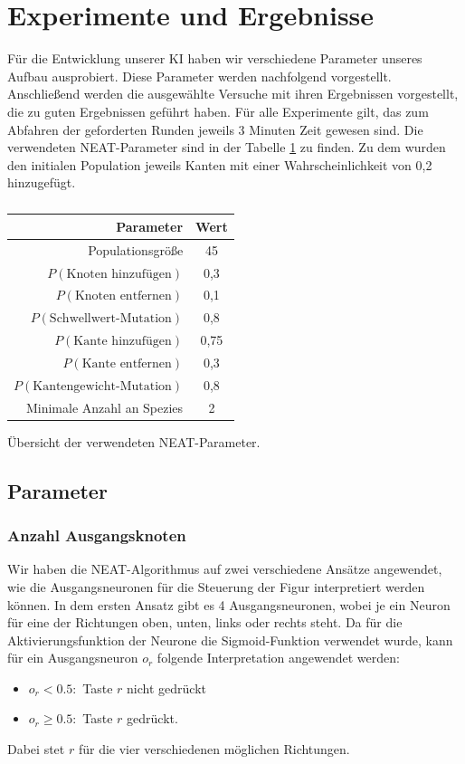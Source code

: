 \documentclass[11pt,final,journal,a4paper,towside,towcolumn]{IEEEtran}
\begin{document}
\section{Experimente und Ergebnisse}

Für die Entwicklung unserer \ac{KI} haben wir verschiedene Parameter unseres Aufbau ausprobiert. Diese Parameter werden nachfolgend vorgestellt. Anschließend werden die ausgewählte Versuche mit ihren Ergebnissen vorgestellt, die zu guten Ergebnissen geführt haben.
Für alle Experimente gilt, das zum Abfahren der geforderten Runden jeweils 3 Minuten Zeit gewesen sind. Die verwendeten \ac{NEAT}-Parameter sind in der Tabelle \ref{tab:NEAT} zu finden.
Zu dem wurden den initialen Population jeweils Kanten mit einer Wahrscheinlichkeit von 0,2 hinzugefügt.
\begin{table}
	\centering
	\begin{tabular}{|r|c|}
		\hline
		Parameter & Wert \\\hline\hline
		Populationsgröße & 45 \\\hline
		$P\left(\textrm{Knoten hinzufügen}\right)$ & 0,3 \\\hline
		$P\left(\textrm{Knoten entfernen}\right)$ & 0,1 \\\hline
		$P\left(\textrm{Schwellwert-Mutation}\right)$ & 0,8 \\\hline
		$P\left(\textrm{Kante hinzufügen}\right)$ & 0,75 \\\hline
		$P\left(\textrm{Kante entfernen}\right)$ & 0,3 \\\hline
		$P\left(\textrm{Kantengewicht-Mutation}\right)$ & 0,8 \\\hline
		Minimale Anzahl an Spezies & 2 \\\hline
	\end{tabular}
	\label{tab:NEAT}
	\caption{}{Übersicht der verwendeten \ac{NEAT}-Parameter.}
\end{table}
\subsection{Parameter}
\subsubsection{Anzahl Ausgangsknoten}
Wir haben die \ac{NEAT}-Algorithmus auf zwei verschiedene Ansätze angewendet, wie die Ausgangsneuronen für die Steuerung der Figur interpretiert werden können. 
In dem ersten Ansatz gibt es 4 Ausgangsneuronen, wobei je ein Neuron für eine der Richtungen oben, unten, links oder rechts steht. Da für die Aktivierungsfunktion der Neurone die Sigmoid-Funktion verwendet wurde, kann für ein Ausgangsneuron $o_r$ folgende Interpretation angewendet werden:
\begin{itemize}
	\item $o_r < 0.5:$ Taste $r$ nicht gedrückt
	\item $o_r \geq 0.5:$ Taste $r$ gedrückt.
\end{itemize}
Dabei stet $r$ für die vier verschiedenen möglichen Richtungen.
\end{document}
